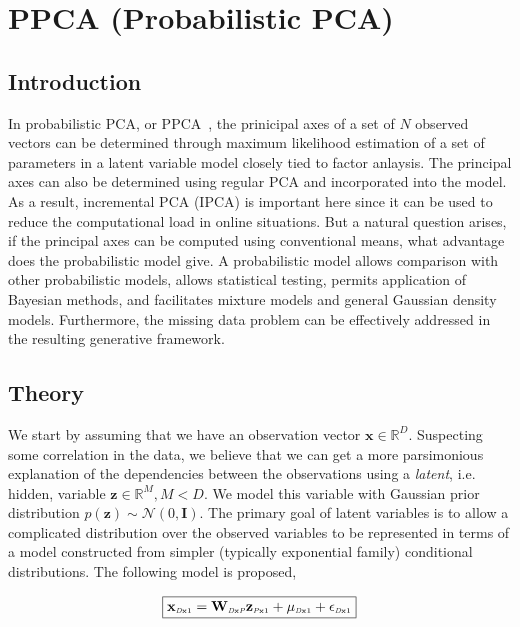 \section{PPCA (Probabilistic PCA)}
\subsection{Introduction}
In probabilistic PCA, or PPCA~\cite{1999_JNL_PPCA_Tipping}, the prinicipal axes of a set of $N$ observed vectors can be determined through maximum likelihood estimation of a set of parameters in a latent variable model closely tied to factor anlaysis.  The principal axes can also be determined using regular PCA and incorporated into the model.  As a result, incremental PCA (IPCA) is important here since it can be used to reduce the computational load in online situations.  But a natural question arises, if the principal axes can be computed using conventional means, what advantage does the probabilistic model give.  A probabilistic model allows comparison with other probabilistic models, allows statistical testing, permits application of Bayesian methods, and facilitates mixture models and general Gaussian density models.  Furthermore, the missing data problem can be effectively addressed in the resulting generative framework.  

\subsection{Theory}
We start by assuming that we have an observation vector $\mathbf{x} \in \mathbb{R}^D$.  Suspecting some correlation in the data, we believe that we can get a more parsimonious explanation of the dependencies between the observations using a \emph{latent}, i.e. hidden, variable  $\mathbf{z} \in \mathbb{R}^M, M<D$.  We model this variable with Gaussian prior distribution $p(\mathbf{z}) \sim \mathcal{N}(0, \mathbf{I})$.  The primary goal of latent variables is to allow a complicated distribution over the observed variables to be represented in terms of a model constructed from simpler (typically exponential family) conditional distributions.
The following model is proposed,

\begin{equation}
\boxed{
\mathbf{x}_{ \textrm{\tiny \emph{D}x1}} = \mathbf{W}_{ \textrm{\tiny \emph{D}x\emph{P}}}\mathbf{z}_{ \textrm{\tiny \emph{P}x1}}+ \mathbf{\mu}_{ \textrm{\tiny \emph{D}x1}} + \mathbf{\epsilon}_{ \textrm{\tiny \emph{D}x1}}}
\end{equation}

